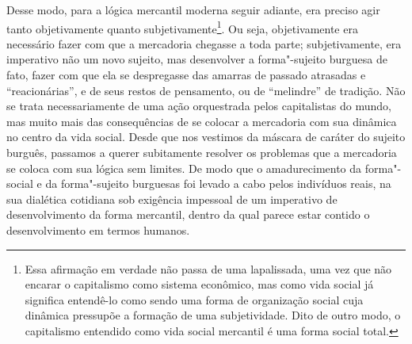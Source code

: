 Desse modo, para a lógica mercantil moderna seguir adiante, era preciso
agir tanto objetivamente quanto subjetivamente\footnote{Essa afirmação
  em verdade não passa de uma lapalissada, uma vez que não encarar o
  capitalismo como sistema econômico, mas como vida social já significa
  entendê-lo como sendo uma forma de organização social cuja dinâmica
  pressupõe a formação de uma subjetividade. Dito de outro modo, o
  capitalismo entendido como vida social mercantil é uma forma social
  total.}. Ou seja, objetivamente era necessário fazer com que a
mercadoria chegasse a toda parte; subjetivamente, era imperativo não um
novo sujeito, mas desenvolver a forma"-sujeito burguesa de fato, fazer
com que ela se despregasse das amarras de passado atrasadas e
``reacionárias'', e de seus restos de pensamento, ou de ``melindre'' de
tradição. Não se trata necessariamente de uma ação orquestrada pelos
capitalistas do mundo, mas muito mais das consequências de se colocar a
mercadoria com sua dinâmica no centro da vida social. Desde que nos
vestimos da máscara de caráter do sujeito burguês, passamos a querer
subitamente resolver os problemas que a mercadoria se coloca com sua
lógica sem limites. De modo que o amadurecimento da forma"-social e da
forma"-sujeito burguesas foi levado a cabo pelos indivíduos reais, na sua
dialética cotidiana sob exigência impessoal de um imperativo de
desenvolvimento da forma mercantil, dentro da qual parece estar contido
o desenvolvimento em termos humanos.

